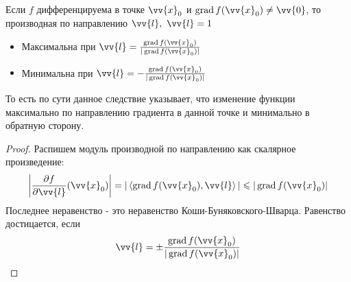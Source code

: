 \begin{corollary}
	Если $f$ дифференцируема в точке $\vv{x}_0$ и $\grad f(\vv{x}_0) \neq \vv{0}$, то производная по направлению $\vv{l},\ \vv{l} = 1$
	\begin{itemize}
		\item Максимальна при $\vv{l} = \frac{\grad f(\vv{x}_0)}{|\grad f(\vv{x}_0)|}$
		
		\item Минимальна при $\vv{l} = -\frac{\grad f(\vv{x}_0)}{|\grad f(\vv{x}_0)|}$
	\end{itemize}
\end{corollary}

\begin{note}
	То есть по сути данное следствие указывает, что изменение функции максимально по направлению градиента в данной точке и минимально в обратную сторону.
\end{note}

\begin{proof}
	Распишем модуль производной по направлению как скалярное произведение:
	\[
		\left|\pd{f}{\vv{l}} (\vv{x}_0)\right| = |\trbr{\grad f(\vv{x}_0), \vv{l}}| \le |\grad f(\vv{x}_0)|
	\]
	Последнее неравенство - это неравенство Коши-Буняковского-Шварца. Равенство достицается, если
	\[
		\vv{l} = \pm \frac{\grad f(\vv{x}_0)}{|\grad f(\vv{x}_0)|}
	\]
\end{proof}